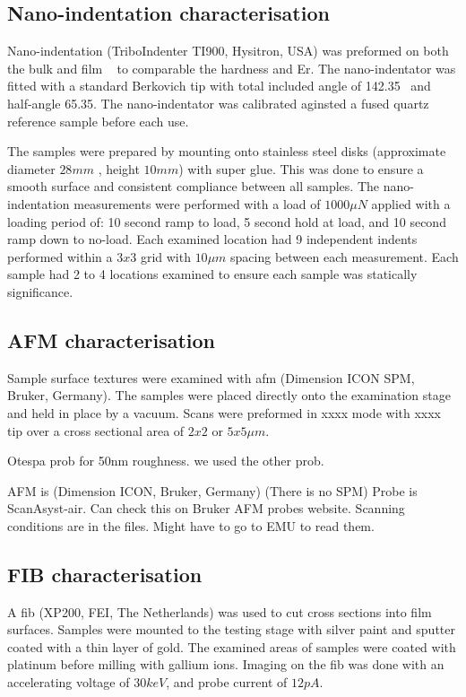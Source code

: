 \documentclass[a4paper,12pt,oneside]{report}%
\begin{document}
\subsection{Nano-indentation characterisation}
Nano-indentation (TriboIndenter TI900, Hysitron, USA) was preformed on both the bulk and film \MgZnCa~ to comparable the hardness and \gls{Er}. The nano-indentator was fitted with a standard Berkovich tip with total included angle of 142.35\degree~ and half-angle 65.35\degree. The nano-indentator was calibrated aginsted a fused quartz reference sample before each use.   

The samples were prepared by mounting onto stainless steel disks (approximate diameter $28mm$ , height $10mm$) with super glue. This was done to ensure a smooth surface and consistent compliance between all samples. The nano-indentation measurements were performed with a load of $1000 \mu N$ applied with a loading period of: 10 second ramp to load, 5 second hold at load, and 10 second ramp down to no-load. Each examined location had 9 independent indents performed within a $3 x 3$ grid with $10 \mu m$ spacing between each measurement. Each sample had 2 to 4 locations examined to ensure each sample was statically significance. 

\subsection{AFM characterisation}
Sample surface textures were examined with \gls{afm} (Dimension ICON SPM, Bruker, Germany). The samples were placed directly onto the examination stage and held in place by a vacuum. Scans were preformed in xxxx mode with xxxx tip over a cross sectional area of $2x2$ or $5x5 \mu m$. 

Otespa prob for 50nm roughness. we used the other prob. 

AFM is (Dimension ICON, Bruker, Germany) (There is no SPM)
Probe is ScanAsyst-air. Can check this on Bruker AFM probes website. 
Scanning conditions are in the files. Might have to go to EMU to read them. 

\subsection{FIB characterisation}
A \gls{fib} (XP200, FEI, The Netherlands) was used to cut cross sections into film surfaces. Samples were mounted to the testing stage with silver paint and sputter coated with a thin layer of gold. The examined areas of samples were coated with platinum before milling with gallium ions. Imaging on the \gls{fib} was done with an accelerating voltage of $30keV$, and probe current of $12 pA$.




\end{document}
